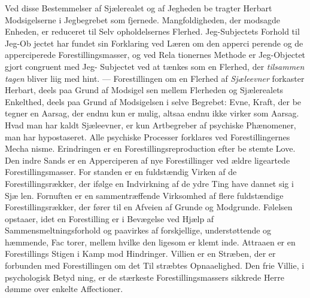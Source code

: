 \documentclass[12pt,a4paper]{book}
\begin{document}
Ved disse Bestemmelser af Sjælerealet og af Jegheden be\-%
tragter Herbart Modsigelserne i Jegbegrebet som fjernede.
Mangfoldigheden, der modsagde Enheden, er reduceret til Selv\-%
opholdelsernes Flerhed. Jeg-Subjectets Forhold til Jeg-Ob\-%
jectet har fundet sin Forklaring ved Læren om den apperci\-%
perende og de apperciperede Forestillingsmasser, og ved Rela\-%
tionernes Methode er Jeg-Objectet gjort congruent med Jeg-%
Subjectet ved at tænkes som en Flerhed, der \emph{tilsammen\-%
tagen} bliver liig med hint. --- Forestillingen om en Flerhed af
\emph{Sjæleevner} forkaster Herbart, deels paa Grund af Modsigel\-%
sen mellem Flerheden og Sjælerealets Enkelthed, deels paa
Grund af Modsigelsen i selve Begrebet: Evne, Kraft, der be\-%
tegner en Aarsag, der endnu kun er mulig, altsaa endnu ikke
virker som Aarsag. Hvad man har kaldt Sjæleevner, er kun
Artbegreber af psychiske Phænomener, man har hypostaseret.
Alle psychiske Processer forklares ved Forestillingernes Mecha\-%
nisme. Erindringen er en Forestillingsreproduction efter be\-%
stemte Love. Den indre Sands er en Apperciperen af nye
Forestillinger ved ældre ligeartede Forestillingsmasser. For\-%
standen er en fuldstændig Virken af de Forestillingsrækker, der
ifølge en Indvirkning af de ydre Ting have dannet sig i Sjæ\-%
len. Fornuften er en sammentræffende Virksomhed af flere
fuldstændige Forestillingsrækker, der fører til en Afveien af
Grunde og Modgrunde. Følelsen opstaaer, idet en Forestilling
er i Bevægelse ved Hjælp af Sammensmeltningsforhold og
paavirkes af forskjellige, understøttende og hæmmende, Fac\-%
torer, mellem hvilke den ligesom er klemt inde. Attraaen er en
Forestillings Stigen i Kamp mod Hindringer. Villien er en
Stræben, der er forbunden med Forestillingen om det Til\-%
stræbtes Opnaaelighed. Den frie Villie, i psychologisk Betyd\-%
ning, er de stærkeste Forestillingsmassers sikkrede Herre\-%
dømme over enkelte Affectioner.
\end{document}
